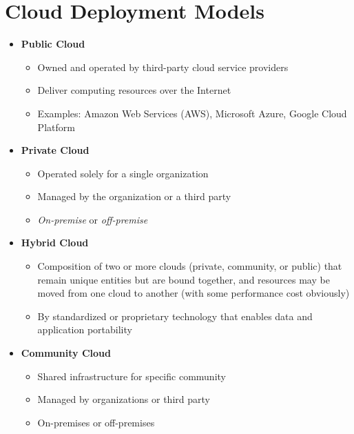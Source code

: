 \section{Cloud Deployment Models}
\begin{itemize}
   \item \textbf{Public Cloud}
   \begin{itemize}
      \item Owned and operated by third-party cloud service providers
      \item Deliver computing resources over the Internet
      \item Examples: Amazon Web Services (AWS), Microsoft Azure, Google Cloud Platform
   \end{itemize}
   \item \textbf{Private Cloud}
   \begin{itemize}
      \item Operated solely for a single organization
      \item Managed by the organization or a third party
      \item \textit{On-premise} or \textit{off-premise}
   \end{itemize}
   \item \textbf{Hybrid Cloud}
   \begin{itemize}
      \item Composition of two or more clouds (private, community, or public) that remain unique entities but are bound together, and resources may be moved from one cloud to another (with some performance cost obviously) 
      \item By standardized or proprietary technology that enables data and application portability
   \end{itemize}
   \item \textbf{Community Cloud}
   \begin{itemize}
      \item Shared infrastructure for specific community
      \item Managed by organizations or third party
      \item On-premises or off-premises
   \end{itemize}
\end{itemize}

